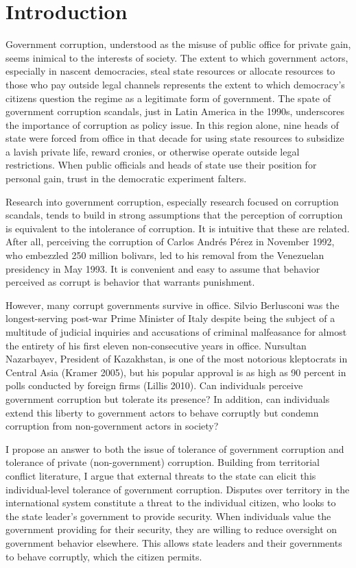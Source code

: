\documentclass[11pt,]{article}
\begin{document}
\vskip -8.5pt


\noindent  \section{Introduction}\label{introduction}

Government corruption, understood as the misuse of public office for
private gain, seems inimical to the interests of society. The extent to
which government actors, especially in nascent democracies, steal state
resources or allocate resources to those who pay outside legal channels
represents the extent to which democracy's citizens question the regime
as a legitimate form of government. The spate of government corruption
scandals, just in Latin America in the 1990s, underscores the importance
of corruption as policy issue. In this region alone, nine heads of state
were forced from office in that decade for using state resources to
subsidize a lavish private life, reward cronies, or otherwise operate
outside legal restrictions. When public officials and heads of state use
their position for personal gain, trust in the democratic experiment
falters.

Research into government corruption, especially research focused on
corruption scandals, tends to build in strong assumptions that the
perception of corruption is equivalent to the intolerance of corruption.
It is intuitive that these are related. After all, perceiving the
corruption of Carlos Andrés Pérez in November 1992, who embezzled 250
million bolivars, led to his removal from the Venezuelan presidency in
May 1993. It is convenient and easy to assume that behavior perceived as
corrupt is behavior that warrants punishment.

However, many corrupt governments survive in office. Silvio Berlusconi
was the longest-serving post-war Prime Minister of Italy despite being
the subject of a multitude of judicial inquiries and accusations of
criminal malfeasance for almost the entirety of his first eleven
non-consecutive years in office. Nursultan Nazarbayev, President of
Kazakhstan, is one of the most notorious kleptocrats in Central Asia
(Kramer 2005), but his popular approval is as high as 90 percent in
polls conducted by foreign firms (Lillis 2010). Can individuals perceive
government corruption but tolerate its presence? In addition, can
individuals extend this liberty to government actors to behave corruptly
but condemn corruption from non-government actors in society?

I propose an answer to both the issue of tolerance of government
corruption and tolerance of private (non-government) corruption.
Building from territorial conflict literature, I argue that external
threats to the state can elicit this individual-level tolerance of
government corruption. Disputes over territory in the international
system constitute a threat to the individual citizen, who looks to the
state leader's government to provide security. When individuals value
the government providing for their security, they are willing to reduce
oversight on government behavior elsewhere. This allows state leaders
and their governments to behave corruptly, which the citizen permits.
\end{document}
